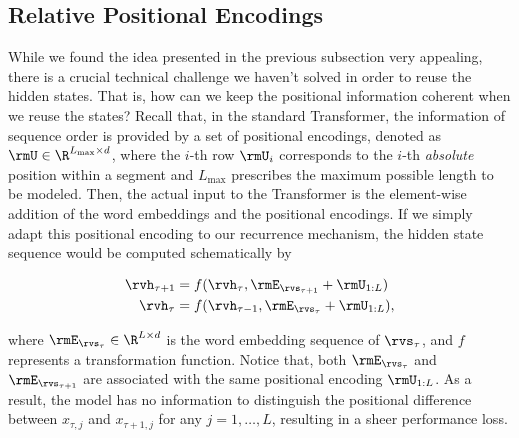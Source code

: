 \subsection{Relative Positional Encodings}
\label{sec:rel-pos-embed}
While we found the idea presented in the previous subsection very appealing, there is a crucial technical challenge we haven't solved in order to reuse the hidden states.
That is, how can we keep the positional information coherent when we reuse the states?
Recall that, in the standard Transformer, the information of sequence order is provided by a set of positional encodings, denoted as $\rmU \in \R^{L_\text{max} \times d}$, where the $i$-th row $\rmU_i$ corresponds to the $i$-th \textit{absolute} position within a segment and $L_\text{max}$ prescribes the maximum possible length to be modeled.
Then, the actual input to the Transformer is the element-wise addition of the word embeddings and the positional encodings.
If we simply adapt this positional encoding to our recurrence mechanism, the hidden state sequence would be computed schematically by
\par\nobreak
\vspace{-0.5em}
\small
\begin{align*}
	\rvh_{\tau+1} &= f(\rvh_{\tau}, \rmE_{\rvs_{\tau+1}} + \rmU_{1:L}) \\
	\rvh_{\tau} &= f(\rvh_{\tau-1}, \rmE_{\rvs_{\tau}} + \rmU_{1:L}),
\end{align*}
\normalsize
\vspace{-1.5em}

\noindent where $\rmE_{\rvs_{\tau}} \in \R^{L \times d}$ is the word embedding sequence of $\rvs_{\tau}$, and $f$ represents a transformation function.
Notice that, both $\rmE_{\rvs_{\tau}}$ and $\rmE_{\rvs_{\tau+1}}$ are associated with the same positional encoding $\rmU_{1:L}$.
As a result, the model has no information to distinguish the positional difference between $x_{\tau,j}$ and $x_{\tau+1,j}$ for any $j = 1, \dots, L$, resulting in a sheer performance loss.

